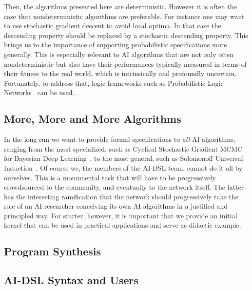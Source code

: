 \documentclass[]{report}
\begin{document}
Then, the algorithms presented here are deterministic.  However it is
often the case that nondeterministic algorithms are preferable.  For
instance one may want to use stochastic gradient descent to avoid
local optima.  In that case the descending property should be replaced
by a stochastic descending property.  This brings us to the importance
of supporting probabilistic specifications more generally.  This is
especially relevant to AI algorithms that are not only often
nondeterministic but also have their performances typically measured
in terms of their fitness to the real world, which is intrinsically
and profoundly uncertain.  Fortunately, to address that, logic
frameworks such as Probabilistic Logic Networks~\cite{Goertzel09PLN}
can be used.\\

\subsection{More, More and More Algorithms}
In the long run we want to provide formal specifications to \emph{all}
AI algorithms, ranging from the most specialized, such as Cyclical
Stochastic Gradient MCMC for Bayesian Deep Learning~\cite{Zhang2020},
to the most general, such as Solomonoff Universal
Induction~\cite{Solomonoff1964}.  Of course we, the members of the
AI-DSL team, cannot do it all by ourselves.  This is a monumental task
that will have to be progressively crowdsourced to the community, and
eventually to the network itself.  The latter has the interesting
ramification that the network should progressively take the role of an
AI researcher conceiving its own AI algorithms in a justified and
principled way.  For starter, however, it is important that we provide
an initial kernel that can be used in practical applications and serve
as didactic example.

\subsection{Program Synthesis}

\subsection{AI-DSL Syntax and Users}

\appendix
\end{document}
